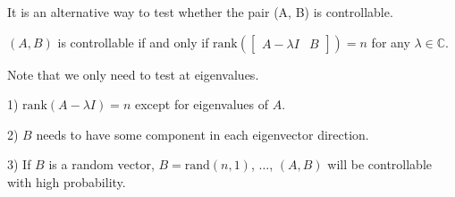 It is an alternative way to test whether the pair (A, B) is controllable. 

\begin{tcolorbox}[colback=green!10,colframe=green!50!black,title=\textbf{PBH Criterion}]
    \((A, B)\) is controllable if and only if \(\text{rank}\left(\begin{bmatrix} A - \lambda I & B \end{bmatrix}\right) = n\)
    for any \(\lambda \in \mathbb{C}\).
\end{tcolorbox}

Note that we only need to test at eigenvalues.

1) \(\text{rank}(A - \lambda I) = n\) except for eigenvalues of \(A\).

2) \(B\) needs to have some component in each eigenvector direction.

3) If \(B\) is a random vector, \(B = \text{rand}(n, 1)\), \(\dots\), \((A, B)\) will be controllable with high probability.


























